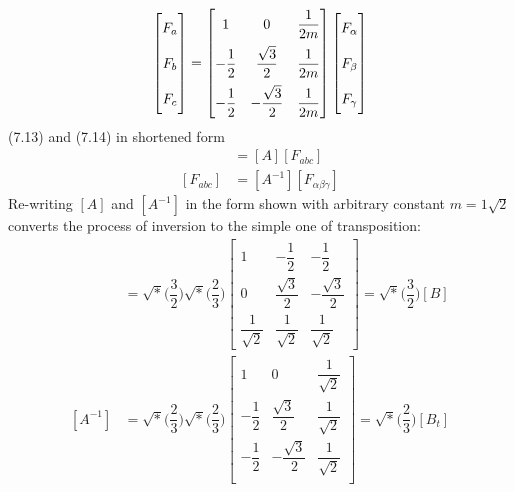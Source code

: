 \documentclass[a4paper,numbers=noenddot,12pt]{scrbook}
\begin{document}
    \begin{equation}
        \begin{bmatrix}
            F_a \vphantom{\dfrac{1}{2}} \\[2ex]
            F_b \vphantom{\dfrac{1}{2}} \\[2ex]
            F_c \vphantom{\dfrac{1}{2}} \\
        \end{bmatrix}
        =
        \begin{bmatrix}
            1  & 0 & \dfrac{1}{2m} \\[2ex]
            - \dfrac{1}{2} & \dfrac{\sqrt{3}}{2} & \dfrac{1}{2m} \\[2ex]
            - \dfrac{1}{2} & - \dfrac{\sqrt{3}}{2} & \dfrac{1}{2m}
        \end{bmatrix}
        \begin{bmatrix}
            F_{\alpha} \vphantom{\dfrac{1}{2}} \\[2ex]
            F_{\beta} \vphantom{\dfrac{1}{2}} \\[2ex]
            F_{\gamma} \vphantom{\dfrac{1}{2}} 
        \end{bmatrix}
        \label{eq:Eq7.14}
    \end{equation}
    (7.13) and (7.14) in shortened form
    \begin{align}
        [F_{\alpha \beta \gamma}] & =  [A][F_{abc}]\\
        [F_{abc}] & = [A^{-1}] [F_{\alpha \beta \gamma}]
        \label{eq:Eq7.16}
    \end{align}
    Re-writing $[A]$ and $[A^{-1}]$ in the form shown with arbitrary constant $m = 1 \sqrt{2}$ converts the process of inversion to the simple one of transposition:
    \begin{align}
        [A] & = \sqrt*{\Big(\dfrac{3}{2}\Big)} \sqrt*{\Big(\dfrac{2}{3}\Big)}
        \begin{bmatrix}
            1  & - \dfrac{1}{2} & - \dfrac{1}{2} \\[2ex]
            0 & \dfrac{\sqrt{3}}{2} & - \dfrac{\sqrt{3}}{2} \\[2ex]
            \dfrac{1}{\sqrt{2}} & \dfrac{1}{\sqrt{2}} & \dfrac{1}{\sqrt{2}}
        \end{bmatrix}
        =
        \sqrt*{\Big(\dfrac{3}{2}\Big)}[B] \\
        [A^{-1}] & = \sqrt*{\Big(\dfrac{2}{3}\Big)} \sqrt*{\Big(\dfrac{2}{3}\Big)}
        \begin{bmatrix}
            1 & 0 & \dfrac{1}{\sqrt{2}} \\[2ex]
            - \dfrac{1}{2} & \dfrac{\sqrt{3}}{2} & \dfrac{1}{\sqrt{2}} \\[2ex]
            - \dfrac{1}{2} & - \dfrac{\sqrt{3}}{2} & \dfrac{1}{\sqrt{2}}\\
        \end{bmatrix}
        =
        \sqrt*{\Big(\dfrac{2}{3}\Big)}[B_t] 
        \label{eq:Eq7.18}
    \end{align}
\end{document}
